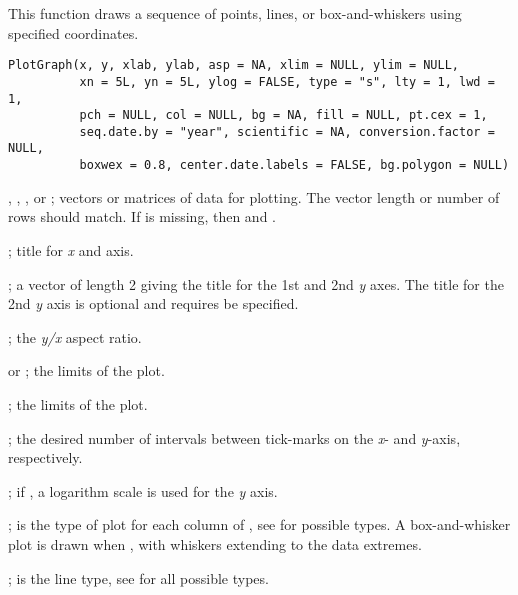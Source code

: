 \documentclass[a4paper]{book}
\begin{document}
%
\begin{Description}\relax
This function draws a sequence of points, lines, or box-and-whiskers using specified coordinates.
\end{Description}
%
\begin{Usage}
\begin{verbatim}
PlotGraph(x, y, xlab, ylab, asp = NA, xlim = NULL, ylim = NULL,
          xn = 5L, yn = 5L, ylog = FALSE, type = "s", lty = 1, lwd = 1,
          pch = NULL, col = NULL, bg = NA, fill = NULL, pt.cex = 1,
          seq.date.by = "year", scientific = NA, conversion.factor = NULL,
          boxwex = 0.8, center.date.labels = FALSE, bg.polygon = NULL)
\end{verbatim}
\end{Usage}
%
\begin{Arguments}
\begin{ldescription}
\item[\code{x, y}] , , , or ; vectors or matrices of data for plotting.
The vector length or number of rows should match.
If  is missing, then  and .
\item[\code{xlab}] ; title for \emph{x} and axis.
\item[\code{ylab}] ; a vector of length 2 giving the title for the 1st and 2nd \emph{y} axes.
The title for the 2nd \emph{y} axis is optional and requires  be specified.
\item[\code{asp}] ; the \emph{y/x} aspect ratio.
\item[\code{xlim}]  or ; the  limits  of the plot.
\item[\code{ylim}] ; the  limits  of the plot.
\item[\code{xn, yn}] ; the desired number of intervals between tick-marks on the \emph{x}- and \emph{y}-axis, respectively.
\item[\code{ylog}] ; if , a logarithm scale is used for the \emph{y} axis.
\item[\code{type}] ; is the type of plot for each column of , see  for possible types.
A box-and-whisker plot is drawn when , with whiskers extending to the data extremes.
\item[\code{lty}] ; is the line type, see  for all possible types.

\end{ldescription}
\end{Arguments}
\end{document}
